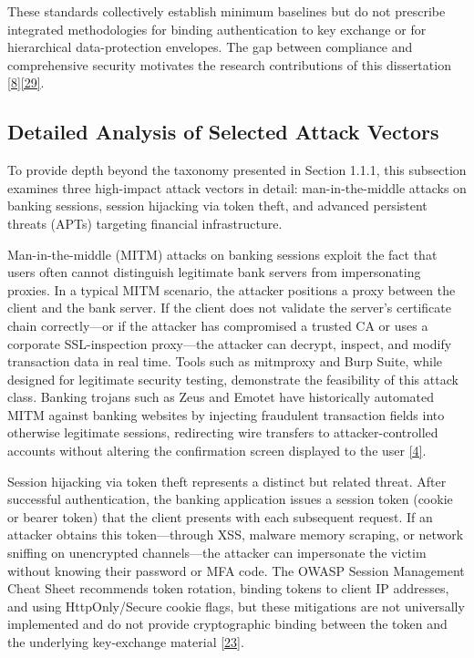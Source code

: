 \indent These standards collectively establish minimum baselines but do not prescribe integrated methodologies for binding authentication to key exchange or for hierarchical data-protection envelopes. The gap between compliance and comprehensive security motivates the research contributions of this dissertation \hyperref[ref:8]{[8]}\hyperref[ref:29]{[29]}.

\subsection{Detailed Analysis of Selected Attack Vectors}

\indent To provide depth beyond the taxonomy presented in Section 1.1.1, this subsection examines three high-impact attack vectors in detail: man-in-the-middle attacks on banking sessions, session hijacking via token theft, and advanced persistent threats (APTs) targeting financial infrastructure.

\indent Man-in-the-middle (MITM) attacks on banking sessions exploit the fact that users often cannot distinguish legitimate bank servers from impersonating proxies. In a typical MITM scenario, the attacker positions a proxy between the client and the bank server. If the client does not validate the server's certificate chain correctly---or if the attacker has compromised a trusted CA or uses a corporate SSL-inspection proxy---the attacker can decrypt, inspect, and modify transaction data in real time. Tools such as mitmproxy and Burp Suite, while designed for legitimate security testing, demonstrate the feasibility of this attack class. Banking trojans such as Zeus and Emotet have historically automated MITM against banking websites by injecting fraudulent transaction fields into otherwise legitimate sessions, redirecting wire transfers to attacker-controlled accounts without altering the confirmation screen displayed to the user \hyperref[ref:4]{[4]}.

\indent Session hijacking via token theft represents a distinct but related threat. After successful authentication, the banking application issues a session token (cookie or bearer token) that the client presents with each subsequent request. If an attacker obtains this token---through XSS, malware memory scraping, or network sniffing on unencrypted channels---the attacker can impersonate the victim without knowing their password or MFA code. The OWASP Session Management Cheat Sheet recommends token rotation, binding tokens to client IP addresses, and using HttpOnly/Secure cookie flags, but these mitigations are not universally implemented and do not provide cryptographic binding between the token and the underlying key-exchange material \hyperref[ref:23]{[23]}.

